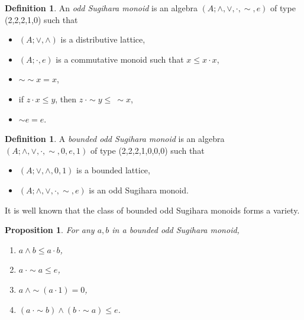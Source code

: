 \documentclass[a4paper,11pt]{article}
\newtheorem{prop}[theorem]{Proposition}
\theoremstyle{definition}
\newtheorem{defn}[theorem]{Definition}
\begin{document}
\begin{defn} \label{OSM}
An \emph{odd Sugihara monoid} is an algebra $(A; \wedge, \vee, \cdot, \sim, e)$ of type (2,2,2,1,0) such that 
\begin{itemize}
		\item[\textbf{A1}] $(A; \vee, \wedge)$ is a distributive lattice,
		\item[\textbf{A2}] $(A; \cdot, e)$ is a commutative monoid such that $x \leq x \cdot x$,
		\item[\textbf{A3}] $\sim \sim x = x$,
		\item[\textbf{A4}] if $z \cdot x \leq y$, then $z\ \cdot \sim y \leq\ \sim x$,
		\item[\textbf{A5}] $\sim e = e$.
	\end{itemize}
\end{defn}

\begin{defn} \label{BOSM}
A \emph{bounded odd Sugihara monoid} is an algebra $(A; \wedge, \vee, \cdot, \sim, 0, e, 1)$ of type (2,2,2,1,0,0,0) such that 
\begin{itemize}
		\item[\textbf{}] $(A; \vee, \wedge, 0, 1)$ is a bounded lattice,
		\item[\textbf{}] $(A; \wedge, \vee, \cdot, \sim, e)$ is an odd Sugihara monoid.
	\end{itemize}
\end{defn}

It is well known that the class of bounded odd Sugihara monoids forms a variety.

\begin{prop} \label{basicfacts}
For any $a, b$ in a bounded odd Sugihara monoid, 
\begin{enumerate}
	\item[(i)] $a \wedge b \leq a \cdot b$,
	\item[(ii)] $a\ \cdot \sim a \leq e$,
	\item[(iii)] $a\ \wedge \sim(a \cdot 1) = 0$,
    \item[(iv)] $(a\ \cdot \sim b) \wedge (b\ \cdot \sim a)\leq e$.
\end{enumerate}
\end{prop}
\end{document}
